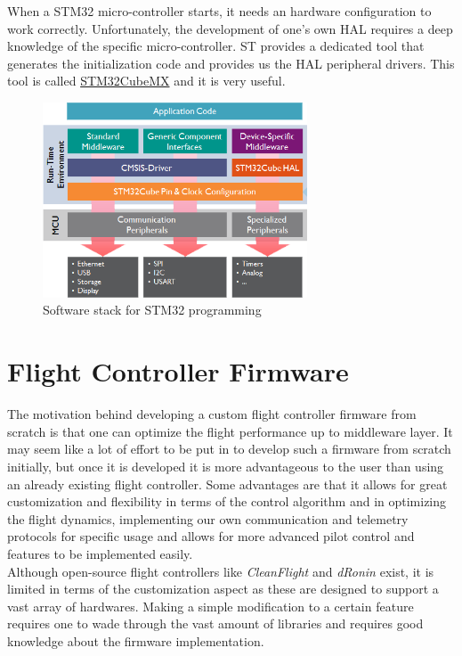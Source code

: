 \documentclass[a4paper,12pt,oneside]{book}
\begin{document}
When a STM32 micro-controller starts, it needs an hardware configuration to work correctly. Unfortunately, the development of one's own HAL requires a deep knowledge of the specific micro-controller. ST provides a dedicated tool that generates the initialization code and provides us the HAL peripheral drivers. This tool is called \href{http://www.st.com/en/development-tools/stm32cubemx.html}{STM32CubeMX} and it is very useful.\cite{carmine}\\

\begin{figure}[!htb]
\centering
\includegraphics[width=0.7\textwidth]{images/software_stack}
\caption{Software stack for STM32 programming}
\label{fig:software_stack}
\end{figure}

\chapter[Flight Controller Firmware]{Flight Controller Firmware}
The motivation behind developing a custom flight controller firmware from scratch is that one can optimize the flight performance up to middleware layer. It may seem like a lot of effort to be put in to develop such a firmware from scratch initially, but once it is developed it is more advantageous to the user than using an already existing flight controller. Some advantages are that it allows for great customization and flexibility in terms of the control algorithm and in optimizing the flight dynamics, implementing our own communication and telemetry protocols for specific usage and allows for more advanced pilot control and features to be implemented easily.\\

Although open-source flight controllers like \textit{CleanFlight} and \textit{dRonin} exist, it is limited in terms of the customization aspect as these are designed to support a vast array of hardwares. Making a simple modification to a certain feature requires one to wade through the vast amount of libraries and requires good knowledge about the firmware implementation.\\
\end{document}
